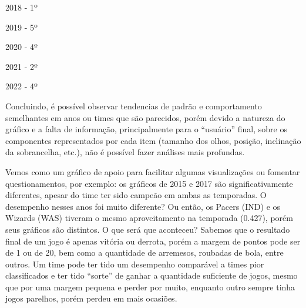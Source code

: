 \documentclass[
]{book}
\begin{document}
2018 - 1º

2019 - 5º

2020 - 4º

2021 - 2º

2022 - 4º

Concluindo, é possível observar tendencias de padrão e comportamento semelhantes em anos ou times que são parecidos, porém devido a natureza do gráfico e a falta de informação, principalmente para o ``usuário'' final, sobre os componentes representados por cada item (tamanho dos olhos, posição, inclinação da sobrancelha, etc.), não é possível fazer análises mais profundas.

Vemos como um gráfico de apoio para facilitar algumas visualizações ou fomentar questionamentos, por exemplo: os gráficos de 2015 e 2017 são significativamente diferentes, apesar do time ter sido campeão em ambas as temporadas. O desempenho nesses anos foi muito diferente? Ou então, os Pacers (IND) e os Wizards (WAS) tiveram o mesmo aproveitamento na temporada (0.427), porém seus gráficos são distintos. O que será que aconteceu? Sabemos que o resultado final de um jogo é apenas vitória ou derrota, porém a margem de pontos pode ser de 1 ou de 20, bem como a quantidade de arremesos, roubadas de bola, entre outros. Um time pode ter tido um desempenho comparável a times pior classificados e ter tido ``sorte'' de ganhar a quantidade suficiente de jogos, mesmo que por uma margem pequena e perder por muito, enquanto outro sempre tinha jogos parelhos, porém perdeu em mais ocasiões.

  
\end{document}
